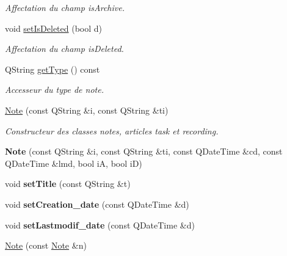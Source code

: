 \begin{DoxyCompactItemize}
\begin{DoxyCompactList}\small\item\em Affectation du champ is\+Archive. \end{DoxyCompactList}\item 
\mbox{\label{class_note_a613e10e150caaeb73a24c342553e6c0e}} 
void \hyperlink{class_note_a613e10e150caaeb73a24c342553e6c0e}{set\+Is\+Deleted} (bool d)
\begin{DoxyCompactList}\small\item\em Affectation du champ is\+Deleted. \end{DoxyCompactList}\item 
\mbox{\label{class_note_a342ef6ee08089d6b973e46c0bbfd8735}} 
Q\+String \hyperlink{class_note_a342ef6ee08089d6b973e46c0bbfd8735}{get\+Type} () const
\begin{DoxyCompactList}\small\item\em Accesseur du type de note. \end{DoxyCompactList}\item 
\hyperlink{class_note_a0490153115307d5f59974d7000260e48}{Note} (const Q\+String \&i, const Q\+String \&ti)
\begin{DoxyCompactList}\small\item\em Constructeur des classes notes, articles task et recording. \end{DoxyCompactList}\item 
\mbox{\label{class_note_a0c1c2ba85358585f266b0fdcbcb45a70}} 
{\bfseries Note} (const Q\+String \&i, const Q\+String \&ti, const Q\+Date\+Time \&cd, const Q\+Date\+Time \&lmd, bool iA, bool iD)
\item 
\mbox{\label{class_note_a7a9ca310664f058b56ccc33005688e25}} 
void {\bfseries set\+Title} (const Q\+String \&t)
\item 
\mbox{\label{class_note_ab83acc1404775a43af17a31edeaae246}} 
void {\bfseries set\+Creation\+\_\+date} (const Q\+Date\+Time \&d)
\item 
\mbox{\label{class_note_a2cb5616e643b49316bd95e9a2b958e44}} 
void {\bfseries set\+Lastmodif\+\_\+date} (const Q\+Date\+Time \&d)
\item 
\hyperlink{class_note_ac06fd282c05bbfe2e1675fe0677b2efb}{Note} (const \hyperlink{class_note}{Note} \&n)

\end{DoxyCompactItemize}
